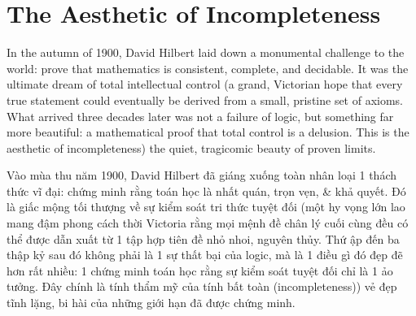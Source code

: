 \documentclass[11pt]{article}
\begin{document}
\section{The Aesthetic of Incompleteness}
In the autumn of 1900, David Hilbert laid down a monumental challenge to the world: prove that mathematics is consistent, complete, and decidable. It was the ultimate dream of total intellectual control (a grand, Victorian hope that every true statement could eventually be derived from a small, pristine set of axioms. What arrived three decades later was not a failure of logic, but something far more beautiful: a mathematical proof that total control is a delusion. This is the aesthetic of incompleteness) the quiet, tragicomic beauty of proven limits.

Vào mùa thu năm 1900, David Hilbert đã giáng xuống toàn nhân loại 1 thách thức vĩ đại: chứng minh rằng toán học là nhất quán, trọn vẹn, \& khả quyết. Đó là giấc mộng tối thượng về sự kiểm soát tri thức tuyệt đối (một hy vọng lớn lao mang đậm phong cách thời Victoria rằng mọi mệnh đề chân lý cuối cùng đều có thể được dẫn xuất từ 1 tập hợp tiên đề nhỏ nhoi, nguyên thủy. Thứ ập đến ba thập kỷ sau đó không phải là 1 sự thất bại của logic, mà là 1 điều gì đó đẹp đẽ hơn rất nhiều: 1 chứng minh toán học rằng sự kiểm soát tuyệt đối chỉ là 1 ảo tưởng. Đây chính là tính thẩm mỹ của tính bất toàn (incompleteness)) vẻ đẹp tĩnh lặng, bi hài của những giới hạn đã được chứng minh.
\end{document}
